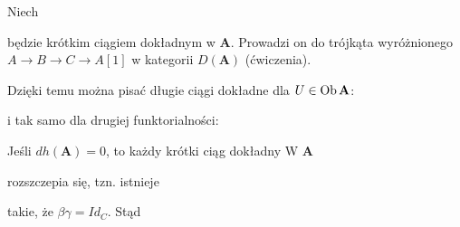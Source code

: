 \begin{conclusion}
  Niech 
  \begin{center}\end{center}
  będzie krótkim ciągiem dokładnym w $\mathbf{A}$. Prowadzi on do trójkąta wyróżnionego $A\to B\to C\to A[1]$ w kategorii $D(\mathbf{A})$ (ćwiczenia).

  Dzięki temu można pisać długie ciągi dokładne dla $U\in\operatorname{Ob}\mathbf{A}$:
  \begin{center}\end{center}

  i tak samo dla drugiej funktorialności:
  \begin{center}\end{center}
\end{conclusion}

\begin{fact}
  Jeśli $dh(\mathbf{A})=0$, to każdy krótki ciąg dokładny W $\mathbf{A}$
  \begin{center}\end{center}
  rozszczepia się, tzn. istnieje
  \begin{center}\end{center}
  takie, że $\beta\gamma=Id_C$. Stąd
  \begin{center}\end{center}
\end{fact}

